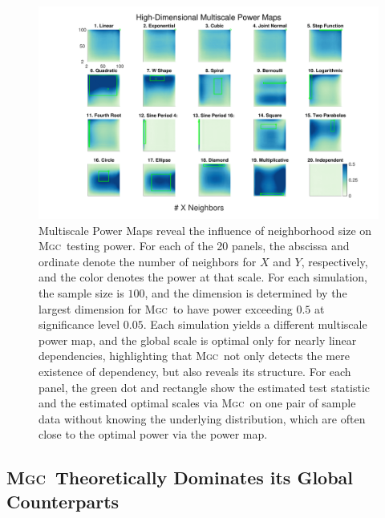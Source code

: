 \documentclass[11pt]{article}
\providecommand{\sct}[1]{{\normalfont\textsc{#1}}}
\newcommand{\Mgc}{\sct{Mgc}}
\begin{document}
\begin{figure}[htbp]
\includegraphics[width=1.0\textwidth,trim={3cm 0.5cm 2.5cm 0.5cm},clip]{Figures/FigHDHeat}
\caption{Multiscale Power Maps reveal the influence of neighborhood size on \Mgc~testing power.
For each of the 20 panels, the abscissa and ordinate denote the number of neighbors for $X$ and  $Y$, respectively, and the color denotes the power at that scale. For each simulation, the sample size is $100$,  and the dimension is determined by the largest dimension for \Mgc~to have power exceeding $0.5$ at significance level $0.05$. Each simulation yields a different multiscale power map, and the global scale is optimal only for nearly linear dependencies, highlighting that \Mgc~not only detects the mere existence of dependency, but also reveals its  structure. 
For each panel, the green dot and rectangle show the estimated test statistic and the estimated optimal scales via \Mgc~on one pair of sample data without knowing the underlying distribution, which are often close to the optimal power via the power map.
}
\label{f:powermaps}
\end{figure}


\subsection*{\Mgc~Theoretically Dominates its Global Counterparts}
\label{s:theory}
\end{document}
